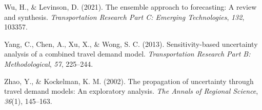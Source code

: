 \documentclass[fancy, masters]{byuthesis}
\newlength{\cslhangindent}
\newlength{\cslentryspacingunit} %
\newenvironment{CSLReferences}[2] %
 {%
  \setlength{\parindent}{0pt}
  \ifodd #1
  \let\oldpar\par
  \def\par{\hangindent=\cslhangindent\oldpar}
  \fi
  \setlength{\parskip}{#2\cslentryspacingunit}
 }%
 {}
\begin{document}
\begin{CSLReferences}{1}{0}
\leavevmode{}%
Wu, H., \& Levinson, D. (2021). The ensemble approach to forecasting: {A} review and synthesis. \emph{Transportation Research Part C: Emerging Technologies}, \emph{132}, 103357.

\leavevmode{}%
Yang, C., Chen, A., Xu, X., \& Wong, S. C. (2013). Sensitivity-based uncertainty analysis of a combined travel demand model. \emph{Transportation Research Part B: Methodological}, \emph{57}, 225--244.

\leavevmode{}%
Zhao, Y., \& Kockelman, K. M. (2002). The propagation of uncertainty through travel demand models: {An} exploratory analysis. \emph{The Annals of Regional Science}, \emph{36}(1), 145--163.

\end{CSLReferences}

\cleardoublepage
\pagestyle{byu}

%
\end{document}

